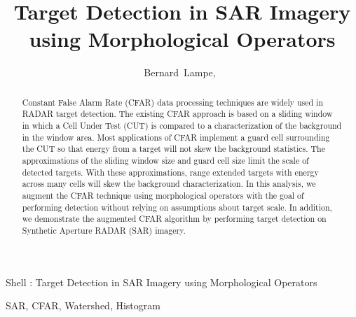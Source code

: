 \documentclass[journal]{IEEEtran}
\begin{document}
\title{Target Detection in SAR Imagery using Morphological Operators}

\author{Bernard~Lampe,~}

{Shell \MakeLowercase{\Lampe}: Target Detection in SAR Imagery using Morphological Operators}

\maketitle

\begin{abstract}
Constant False Alarm Rate (CFAR) data processing techniques are widely used in RADAR target detection. The existing CFAR approach is based on a sliding window in which a Cell Under Test (CUT) is compared to a characterization of the background in the window area. Most applications of CFAR implement a guard cell surrounding the CUT so that energy from a target will not skew the background statistics. The approximations of the sliding window size and guard cell size limit the scale of detected targets. With these approximations, range extended targets with energy across many cells will skew the background characterization. In this analysis, we augment the CFAR technique using morphological operators with the goal of performing detection without relying on assumptions about target scale. In addition, we demonstrate the augmented CFAR algorithm by performing target detection on Synthetic Aperture RADAR (SAR) imagery.
\end{abstract}

\begin{IEEEkeywords}
SAR, CFAR, Watershed, Histogram
\end{IEEEkeywords}

\end{document}
